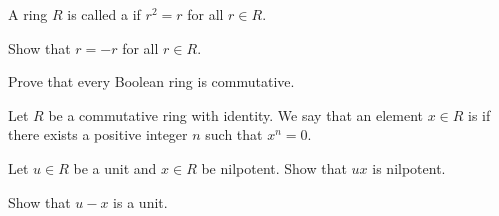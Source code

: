 \begin{problem}
    A ring $R$ is called a  if $r^2 = r$ for all $r \in R$.
    \begin{partquestions}{\roman*}
        \item Show that $r = -r$ for all $r \in R$.
        \item Prove that every Boolean ring is commutative.
    \end{partquestions}
\end{problem}

\begin{problem}
    Let $R$ be a commutative ring with identity. We say that an element $x \in R$ is  if there exists a positive integer $n$ such that $x^n = 0$.
    \begin{partquestions}{\roman*}
        \item Let $u \in R$ be a unit and $x \in R$ be nilpotent. Show that $ux$ is nilpotent.
        \item Show that $u - x$ is a unit.
    \end{partquestions}
\end{problem}
